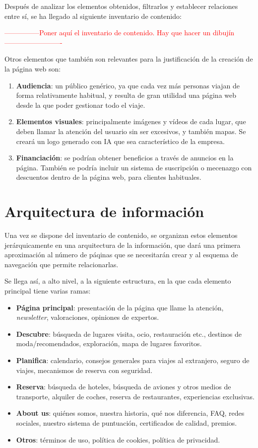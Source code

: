 \documentclass[11pt, a4paper]{book}
\begin{document}
	Después de analizar los elementos obtenidos, filtrarlos y establecer relaciones entre sí, se ha llegado al siguiente inventario de contenido:

	\textcolor{red}{---------------Poner aquí el inventario de contenido. Hay que hacer un dibujín -------------------------}
	
	Otros elementos que también son relevantes para la justificación de la creación de la página web son:
	
	\begin{enumerate}
		\item \textbf{Audiencia}: un público genérico, ya que cada vez más personas viajan de forma relativamente habitual, y resulta de gran utilidad una página web desde la que poder gestionar todo el viaje.
		\item \textbf{Elementos visuales}: principalmente imágenes y vídeos de cada lugar, que deben llamar la atención del usuario sin ser excesivos, y también mapas. Se creará un logo generado con IA que sea característico de la empresa.
		\item \textbf{Financiación}: se podrían obtener beneficios a través de anuncios en la página. También se podría incluir un sistema de suscripción o mecenazgo con descuentos dentro de la página web, para clientes habituales.
	\end{enumerate}


	\section{Arquitectura de información}
	Una vez se dispone del inventario de contenido, se organizan estos elementos jerárquicamente en una arquitectura de la información, que dará una primera aproximación al número de páqinas que se necesitarán crear y al esquema de navegación que permite relacionarlas. 
	
	Se llega así, a alto nivel, a la siguiente estructura, en la que cada elemento principal tiene varias ramas:
	
	\begin{itemize}
		\item \textbf{Página principal}: presentación de la página que llame la atención, \textit{newsletter}, valoraciones, opiniones de expertos.
		\item \textbf{Descubre}: búsqueda de lugares visita, ocio, restauración etc., destinos de moda/recomendados, exploración, mapa de lugares favoritos.
		\item \textbf{Planifica}: calendario, consejos generales para viajes al extranjero, seguro de viajes, mecanismos de reserva con seguridad.
		\item \textbf{Reserva}: búsqueda de hoteles, búsqueda de aviones y otros medios de transporte, alquiler de coches, reserva de restaurantes, experiencias exclusivas.
		\item \textbf{About us}: quiénes somos, nuestra historia, qué nos diferencia, FAQ, redes sociales, nuestro sistema de puntuación, certificados de calidad, premios.
		\item \textbf{Otros}: términos de uso, política de cookies, política de privacidad.
	\end{itemize}
\end{document}
